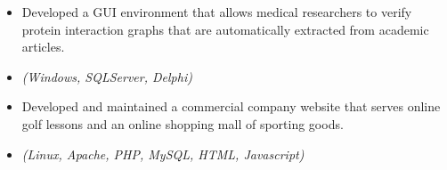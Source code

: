 \begin{itemize}
 \item {Developed a GUI environment that allows medical researchers to verify protein interaction graphs
          that are automatically extracted from academic articles.}
 \item{\it\small(Windows, SQLServer, Delphi)}
\end{itemize}

    
\begin{itemize}
 \item{Developed and maintained a commercial company website that 
          serves online golf lessons and an online shopping mall of sporting goods.}
 \item{\it\small(Linux, Apache, PHP, MySQL, HTML, Javascript)}
\end{itemize}
